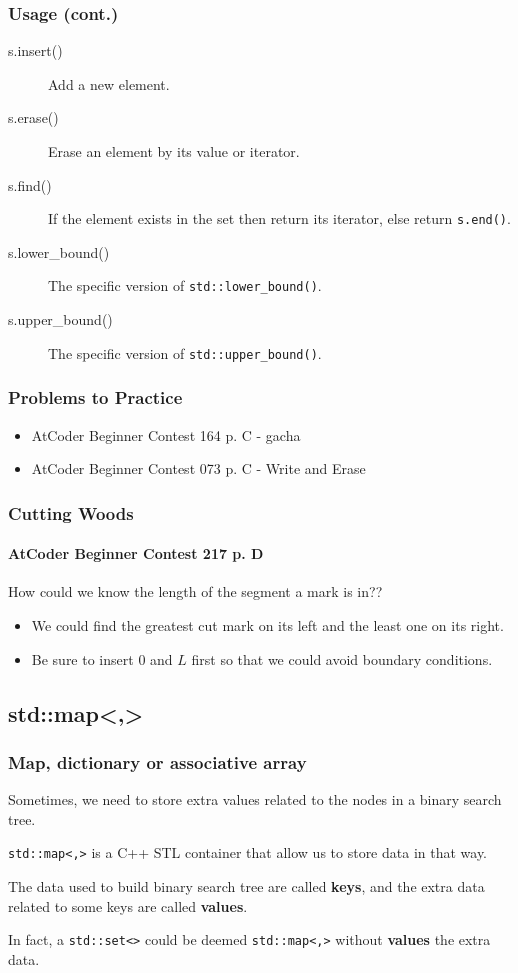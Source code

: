 \documentclass{beamer}
\begin{document}
\frame
{
	\frametitle{Usage (cont.)}
	
	\begin{description}
		\item[\ttfamily s.insert()] Add a new element.
		\item[\ttfamily s.erase()] Erase an element by its value or iterator.
		\item[\ttfamily s.find()] If the element exists in the set then return its iterator, else return \texttt{s.end()}.
		\item[\ttfamily s.lower\_bound()] The specific version of \texttt{std::lower\_bound()}.
		\item[\ttfamily s.upper\_bound()] The specific version of \texttt{std::upper\_bound()}.
	\end{description}
}

\frame
{
	\frametitle{Problems to Practice}
	
	\begin{itemize}
		\item AtCoder Beginner Contest 164 p. C - gacha
		\item AtCoder Beginner Contest 073 p. C - Write and Erase
	\end{itemize}
}

\frame
{
	\frametitle{Cutting Woods}
	\framesubtitle{AtCoder Beginner Contest 217 p. D}
	
	How could we know the length of the segment a mark is in??\pause
	
	\begin{itemize}
		\item We could find the greatest cut mark on its left and the least one on its right.\pause
		\item Be sure to insert $0$ and $L$ first so that we could avoid boundary  conditions.
	\end{itemize}
}

\subsection{std::map<,>}

\frame
{
	\frametitle{Map, dictionary or associative array}
	
	Sometimes, we need to store extra values related to the nodes in a binary search tree.
	
	\texttt{std::map<,>} is a C++ STL container that allow us to store data in that way.
	
	The data used to build binary search tree are called \textbf{keys}, and the extra data related to some keys are called \textbf{values}.
	
	In fact, a \texttt{std::set<>} could be deemed \texttt{std::map<,>} without \textbf{values} the extra data.
}
\end{document}
